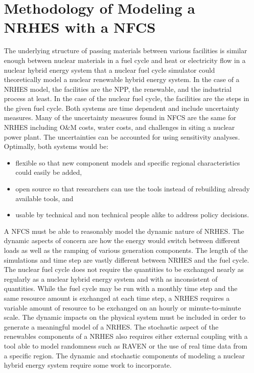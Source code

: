 \documentclass[12pt]{UIdahoMastersThesis}
\begin{document}
\chapter{Methodology of Modeling a NRHES with a NFCS}
The underlying structure of passing materials between various facilities is similar enough between nuclear materials in a fuel cycle and heat or electricity flow in a nuclear hybrid energy system that a nuclear fuel cycle simulator could theoretically model a nuclear renewable hybrid energy system. In the case of a NRHES model, the facilities are the NPP, the renewable, and the industrial process at least.  In the case of the nuclear fuel cycle, the facilities are the steps in the given fuel cycle. Both systems are time dependent and include uncertainty measures. Many of the uncertainty measures found in NFCS are the same for NRHES including O\&M costs, water costs, and challenges in siting a nuclear power plant. The uncertainties can be accounted for using sensitivity analyses. Optimally, both systems would be: 
\begin{itemize}

\item flexible so that new component models and specific regional characteristics could easily be added, 
\item open source so that researchers can use the tools instead of rebuilding already available tools, and 
\item usable by technical and non technical people alike to address policy decisions. 
\end{itemize}
 
A NFCS must be able to reasonably model the dynamic nature of NRHES. The dynamic aspects of concern are how the energy would switch between different loads as well as the ramping of various generation components.  The length of the simulations and time step are vastly different between NRHES and the fuel cycle. The nuclear fuel cycle does not require the quantities to be exchanged nearly as regularly as a nuclear hybrid energy system and with as inconsistent of quantities. While the fuel cycle may be run with a monthly time step and the same resource amount is exchanged at each time step, a NRHES requires a variable amount of resource to be exchanged on an hourly or minute-to-minute scale. The dynamic impacts on the physical system must be included in order to generate a meaningful model of a NRHES. The stochastic aspect of the renewables components of a NRHES also requires either external coupling with a tool able to model randomness such as RAVEN or the use of real time data from a specific region. The dynamic and stochastic components of modeling a nuclear hybrid energy system require some work to incorporate. 
\end{document}

